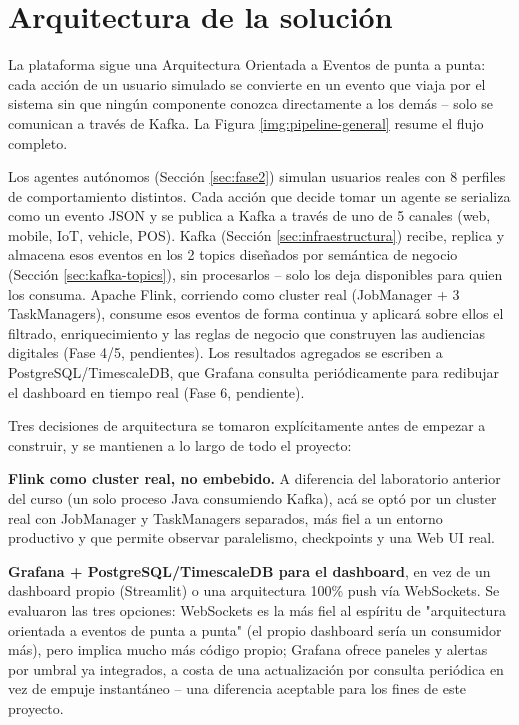 \clearpage
\section{Arquitectura de la solución}
\label{sec:arquitectura}

La plataforma sigue una Arquitectura Orientada a Eventos de punta a punta: cada acción de un usuario simulado se convierte en un evento que viaja por el sistema sin que ningún componente conozca directamente a los demás -- solo se comunican a través de Kafka. La Figura \ref{img:pipeline-general} resume el flujo completo.


Los agentes autónomos (Sección \ref{sec:fase2}) simulan usuarios reales con 8 perfiles de comportamiento distintos. Cada acción que decide tomar un agente se serializa como un evento JSON y se publica a Kafka a través de uno de 5 canales (web, mobile, IoT, vehicle, POS). Kafka (Sección \ref{sec:infraestructura}) recibe, replica y almacena esos eventos en los 2 topics diseñados por semántica de negocio (Sección \ref{sec:kafka-topics}), sin procesarlos -- solo los deja disponibles para quien los consuma. Apache Flink, corriendo como cluster real (JobManager + 3 TaskManagers), consume esos eventos de forma continua y aplicará sobre ellos el filtrado, enriquecimiento y las reglas de negocio que construyen las audiencias digitales (Fase 4/5, pendientes). Los resultados agregados se escriben a PostgreSQL/TimescaleDB, que Grafana consulta periódicamente para redibujar el dashboard en tiempo real (Fase 6, pendiente).

Tres decisiones de arquitectura se tomaron explícitamente antes de empezar a construir, y se mantienen a lo largo de todo el proyecto:

\textbf{Flink como cluster real, no embebido.} A diferencia del laboratorio anterior del curso (un solo proceso Java consumiendo Kafka), acá se optó por un cluster real con JobManager y TaskManagers separados, más fiel a un entorno productivo y que permite observar paralelismo, checkpoints y una Web UI real.

\textbf{Grafana + PostgreSQL/TimescaleDB para el dashboard}, en vez de un dashboard propio (Streamlit) o una arquitectura 100\% push vía WebSockets. Se evaluaron las tres opciones: WebSockets es la más fiel al espíritu de "arquitectura orientada a eventos de punta a punta" (el propio dashboard sería un consumidor más), pero implica mucho más código propio; Grafana ofrece paneles y alertas por umbral ya integrados, a costa de una actualización por consulta periódica en vez de empuje instantáneo -- una diferencia aceptable para los fines de este proyecto.

